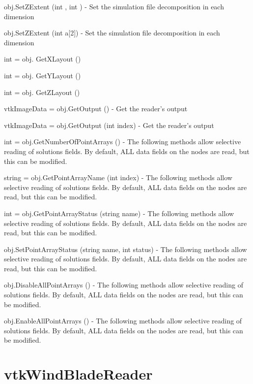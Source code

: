\begin{DoxyItemize}
\item {\ttfamily obj.\-Set\-Z\-Extent (int , int )} -\/ Set the simulation file decomposition in each dimension  
\item {\ttfamily obj.\-Set\-Z\-Extent (int a\mbox{[}2\mbox{]})} -\/ Set the simulation file decomposition in each dimension  
\item {\ttfamily int = obj. Get\-X\-Layout ()}  
\item {\ttfamily int = obj. Get\-Y\-Layout ()}  
\item {\ttfamily int = obj. Get\-Z\-Layout ()}  
\item {\ttfamily vtk\-Image\-Data = obj.\-Get\-Output ()} -\/ Get the reader's output  
\item {\ttfamily vtk\-Image\-Data = obj.\-Get\-Output (int index)} -\/ Get the reader's output  
\item {\ttfamily int = obj.\-Get\-Number\-Of\-Point\-Arrays ()} -\/ The following methods allow selective reading of solutions fields. By default, A\-L\-L data fields on the nodes are read, but this can be modified.  
\item {\ttfamily string = obj.\-Get\-Point\-Array\-Name (int index)} -\/ The following methods allow selective reading of solutions fields. By default, A\-L\-L data fields on the nodes are read, but this can be modified.  
\item {\ttfamily int = obj.\-Get\-Point\-Array\-Status (string name)} -\/ The following methods allow selective reading of solutions fields. By default, A\-L\-L data fields on the nodes are read, but this can be modified.  
\item {\ttfamily obj.\-Set\-Point\-Array\-Status (string name, int status)} -\/ The following methods allow selective reading of solutions fields. By default, A\-L\-L data fields on the nodes are read, but this can be modified.  
\item {\ttfamily obj.\-Disable\-All\-Point\-Arrays ()} -\/ The following methods allow selective reading of solutions fields. By default, A\-L\-L data fields on the nodes are read, but this can be modified.  
\item {\ttfamily obj.\-Enable\-All\-Point\-Arrays ()} -\/ The following methods allow selective reading of solutions fields. By default, A\-L\-L data fields on the nodes are read, but this can be modified.  
\end{DoxyItemize}\hypertarget{vtkparallel_vtkwindbladereader}{}\section{vtk\-Wind\-Blade\-Reader}\label{vtkparallel_vtkwindbladereader}
